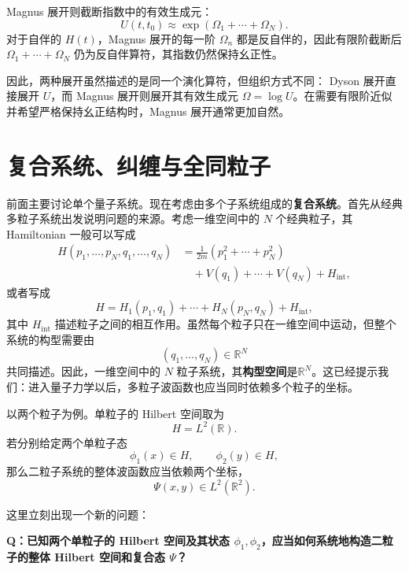 \documentclass[UTF8,a4paper,11pt,openany]{ctexbook}
\begin{document}
Magnus 展开则截断指数中的有效生成元：
\begin{equation}
    U(t,t_0)
    \approx
    \exp\left(
        \Omega_1+\cdots+\Omega_N
    \right).
\end{equation}
对于自伴的 $H(t)$，Magnus 展开的每一阶
$\Omega_n$ 都是反自伴的，因此有限阶截断后
$\Omega_1+\cdots+\Omega_N$ 仍为反自伴算符，其指数仍然保持幺正性。

因此，两种展开虽然描述的是同一个演化算符，但组织方式不同：
Dyson 展开直接展开 $U$，而 Magnus 展开则展开其有效生成元
$\Omega=\log U$。在需要有限阶近似并希望严格保持幺正结构时，Magnus 展开通常更加自然。


\newpage
\chapter{复合系统、纠缠与全同粒子}

前面主要讨论单个量子系统。现在考虑由多个子系统组成的\textbf{复合系统}。首先从经典多粒子系统出发说明问题的来源。考虑一维空间中的 $N$ 个经典粒子，其 Hamiltonian 一般可以写成
\begin{align}
    H(p_1,\ldots,p_N,q_1,\ldots,q_N)
    &=
    \frac{1}{2m}
    \left(
        p_1^2+\cdots+p_N^2
    \right)
    \nonumber\\
    &\quad+
    V(q_1)+\cdots+V(q_N)
    +
    H_{\mathrm{int}},
\end{align}
或者写成
\begin{equation}
    H
    =
    H_1(p_1,q_1)
    +\cdots+
    H_N(p_N,q_N)
    +
    H_{\mathrm{int}},
\end{equation}
其中 $H_{\mathrm{int}}$ 描述粒子之间的相互作用。虽然每个粒子只在一维空间中运动，但整个系统的构型需要由
\[
(q_1,\ldots,q_N)\in\mathbb R^N
\]
共同描述。因此，一维空间中的 $N$ 粒子系统，其\textbf{构型空间}是$\mathbb R^N$。这已经提示我们：进入量子力学以后，多粒子波函数也应当同时依赖多个粒子的坐标。

以两个粒子为例。单粒子的 Hilbert 空间取为
\[
H=L^2(\mathbb R).
\]
若分别给定两个单粒子态
\[
\phi_1(x)\in H,
\qquad
\phi_2(y)\in H,
\]
那么二粒子系统的整体波函数应当依赖两个坐标，
\begin{equation}
    \Psi(x,y)\in L^2(\mathbb R^2).
\end{equation}

这里立刻出现一个新的问题：

\textbf{Q：已知两个单粒子的 Hilbert 空间及其状态
$\phi_1,\phi_2$，应当如何系统地构造二粒子的整体 Hilbert 空间和复合态
$\Psi$？}
\end{document}
